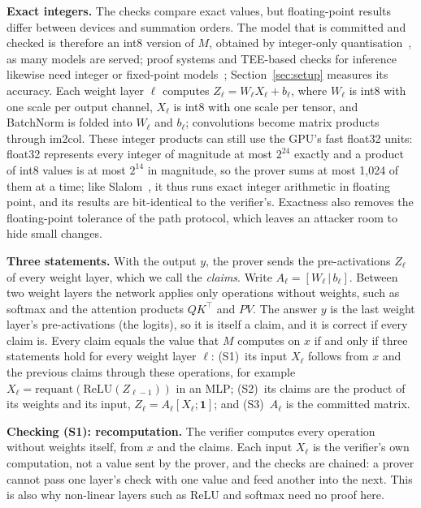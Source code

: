 \documentclass[sigconf,nonacm]{acmart}
\newcommand{\T}{\top}
\newcommand{\para}[1]{\par\noindent\textbf{#1}\quad}
\begin{document}
\para{Exact integers.} The checks compare exact values, but floating-point results differ between
devices and summation orders. The model that is committed and checked is therefore an int8 version
of $M$, obtained by integer-only quantisation~\cite{jacob2018quant}, as many models are served; proof systems and TEE-based checks for inference likewise need integer or fixed-point models~\cite{safetynets,slalom,zkcnn,zen,zkml,zkllm}; Section~\ref{sec:setup}
measures its accuracy. Each weight layer $\ell$
computes $Z_\ell = W_\ell X_\ell + b_\ell$, where $W_\ell$ is int8 with one scale per output
channel, $X_\ell$ is int8 with one scale per tensor, and BatchNorm is folded into $W_\ell$ and
$b_\ell$; convolutions become matrix products through im2col. These integer products can still use
the GPU's fast float32 units: float32 represents every integer of magnitude at most $2^{24}$ exactly and a product of int8 values is at most $2^{14}$ in magnitude, so the prover sums at most 1{,}024 of them at a time; like Slalom~\cite{slalom}, it thus runs exact integer arithmetic in floating point, and its results are bit-identical to the verifier's. Exactness also removes the floating-point tolerance of
the path protocol, which leaves an attacker room to hide small changes.

\para{Three statements.} With the output $y$, the prover sends the pre-activations $Z_\ell$ of every
weight layer, which we call the \emph{claims}. Write $A_\ell = [W_\ell \,|\, b_\ell]$. Between two
weight layers the network applies only operations without weights, such as softmax and the
attention products $QK^\T$ and $PV$. The answer $y$ is the last weight layer's pre-activations
(the logits), so it is itself a claim, and it is correct if every claim is. Every claim equals the
value that $M$ computes on $x$ if and only if three statements hold for every weight layer $\ell$:
(S1)~its input $X_\ell$ follows from $x$ and the previous claims through these operations, for
example $X_\ell = \mathrm{requant}(\mathrm{ReLU}(Z_{\ell-1}))$ in an MLP;
(S2)~its claims are the product of its weights and its input, $Z_\ell = A_\ell[X_\ell; \mathbf 1]$;
and (S3)~$A_\ell$ is the committed matrix.

\para{Checking (S1): recomputation.} The verifier computes every operation without weights itself,
from $x$ and the claims. Each input $X_\ell$ is the verifier's own computation, not a
value sent by the prover, and the checks are chained: a prover cannot pass one layer's check with
one value and feed another into the next. This is also why non-linear layers such as ReLU and
softmax need no proof here.
\end{document}
